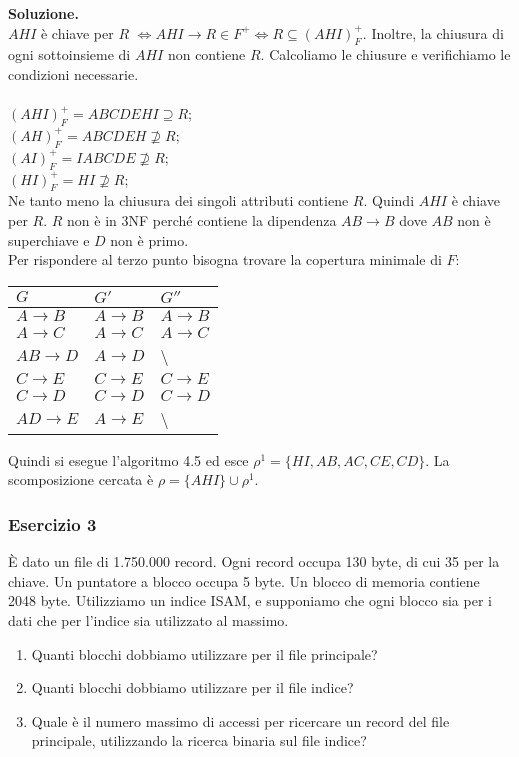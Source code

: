  \noindent\textbf{\fontsize{14pt}{1em}Soluzione.}\\
 $AHI$ è chiave per $R$ $\Leftrightarrow AHI \rightarrow R\in F^+ \Leftrightarrow R \subseteq (AHI)^+_F$. Inoltre, la chiusura
 di ogni sottoinsieme di $AHI$ non contiene $R$.
 Calcoliamo le chiusure e verifichiamo le condizioni necessarie.\\\\
 $(AHI)^+_F = ABCDEHI \supseteq R$;\\
 $(AH)^+_F = ABCDEH \not\supseteq R$;\\
 $(AI)^+_F = IABCDE \not\supseteq R$;\\
 $(HI)^+_F = HI \not\supseteq R$;\\
 Ne tanto meno la chiusura dei singoli attributi contiene $R$. Quindi $AHI$ è chiave per $R$. $R$ non è in 3NF perché contiene
 la dipendenza $AB\rightarrow B$ dove $AB$ non è superchiave e $D$ non è primo.\\

Per rispondere al terzo punto bisogna trovare la copertura minimale di $F$:
\begin{center}
 \begin{tabular}{l|l|l}
  $G$ & $G'$ & $G''$\\
  \hline
  $A\rightarrow B$ & $A\rightarrow B$ & $A\rightarrow B$ \\
  $A \rightarrow C$ & $A \rightarrow C$ & $A \rightarrow C$\\
  $AB \rightarrow D$ & $A \rightarrow D$ & \textbackslash \\ 
  $C \rightarrow E$ & $C \rightarrow E$ & $C \rightarrow E$\\
  $C \rightarrow D$ & $C \rightarrow D$ & $C \rightarrow D$\\
  $AD \rightarrow E$ & $A \rightarrow E$ & \textbackslash\\ 
 \end{tabular}
\end{center}
Quindi si esegue l'algoritmo 4.5 ed esce $\rho^1= \{HI, AB, AC, CE, CD\}$. La scomposizione cercata è
$\rho = \{AHI\} \cup \rho^1$.

\subsubsection{Esercizio 3}
\`E dato un file di 1.750.000 record. Ogni record occupa 130 byte, di cui 35 per la chiave. Un puntatore a blocco occupa 5 byte.
Un blocco di memoria contiene 2048 byte. Utilizziamo un indice ISAM, e supponiamo che ogni blocco sia per i dati che per l'indice 
sia utilizzato al massimo. 
\begin{enumerate}
 \item Quanti blocchi dobbiamo utilizzare per il file principale? 
 \item Quanti blocchi dobbiamo utilizzare per il file indice?
 \item Quale è il numero massimo di accessi per ricercare un record del file principale, utilizzando 
 la ricerca binaria sul file indice?
\end{enumerate}

